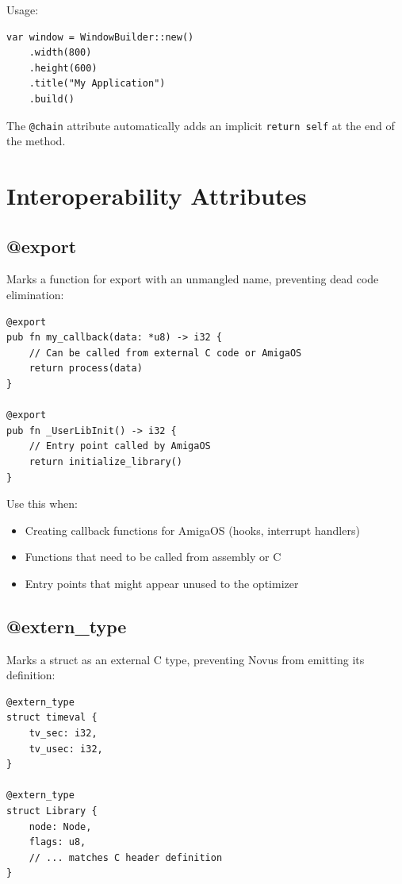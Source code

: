 Usage:

\begin{lstlisting}
var window = WindowBuilder::new()
    .width(800)
    .height(600)
    .title("My Application")
    .build()
\end{lstlisting}

The \texttt{@chain} attribute automatically adds an implicit \texttt{return self} at the end of the method.

\section{Interoperability Attributes}
\label{sec:interop-attributes}

\subsection{@export}

Marks a function for export with an unmangled name, preventing dead code elimination:

\begin{lstlisting}
@export
pub fn my_callback(data: *u8) -> i32 {
    // Can be called from external C code or AmigaOS
    return process(data)
}

@export
pub fn _UserLibInit() -> i32 {
    // Entry point called by AmigaOS
    return initialize_library()
}
\end{lstlisting}

Use this when:
\begin{itemize}
    \item Creating callback functions for AmigaOS (hooks, interrupt handlers)
    \item Functions that need to be called from assembly or C
    \item Entry points that might appear unused to the optimizer
\end{itemize}

\subsection{@extern\_type}

Marks a struct as an external C type, preventing Novus from emitting its definition:

\begin{lstlisting}
@extern_type
struct timeval {
    tv_sec: i32,
    tv_usec: i32,
}

@extern_type
struct Library {
    node: Node,
    flags: u8,
    // ... matches C header definition
}
\end{lstlisting}


